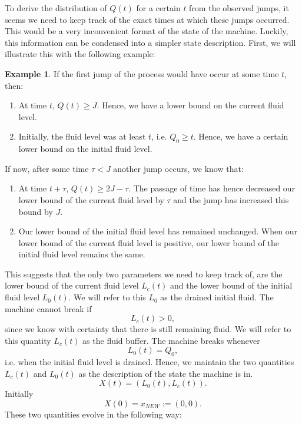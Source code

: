 \documentclass[a4paper]{thesis}
\theoremstyle{definition}
\newtheorem{example}{Example}[chapter]
\begin{document}
To derive the distribution of $Q(t)$ for a certain $t$ from the observed jumps, it seems we need to keep track of the exact times at which these jumps occurred.
This would be a very inconvenient format of the state of the machine.
Luckily, this information can be condensed into a simpler state description.
First, we will illustrate this with the following example:
\begin{example}
	If the first jump of the process would have occur at some time $t$, then:
	\begin{enumerate}
		\item At time $t$, $Q(t)\geq J$.
		Hence, we have a lower bound on the current fluid level.
		\item Initially, the fluid level was at least $t$, i.e. $Q_0\geq t$.
		Hence, we have a certain lower bound on the initial fluid level.
	\end{enumerate}
	If now, after some time $\tau<J$ another jump occurs, we know that:
	\begin{enumerate}
		\item At time $t+\tau$, $Q(t)\geq 2J-\tau$.
		The passage of time has hence decreased our lower bound of the current fluid level by $\tau$ and the jump has increased this bound by $J$.
		\item Our lower bound of the initial fluid level has remained unchanged.
		When our lower bound of the current fluid level is positive, our lower bound of the initial fluid level remains the same.
	\end{enumerate}
\end{example}
This suggests that the only two parameters we need to keep track of, are the lower bound of the current fluid level $L_c(t)$ and the lower bound of the initial fluid level $L_0(t)$.
We will refer to this $L_0$ as the drained initial fluid.
The machine cannot break if 
\[L_c(t)>0,\]
since we know with certainty that there is still remaining fluid.
We will refer to this quantity $L_c(t)$ as the fluid buffer.
The machine breaks whenever
\[L_0(t)=Q_0,\]
i.e. when the initial fluid level is drained.
Hence, we maintain the two quantities $L_c(t)$ and $L_0(t)$ as the description of the state the machine is in.
\[
X(t)=(L_0(t),L_c(t)).
\]
Initially
\[
X(0)=x_{NEW}:=(0,0).
\]
These two quantities evolve in the following way:
\end{document}
